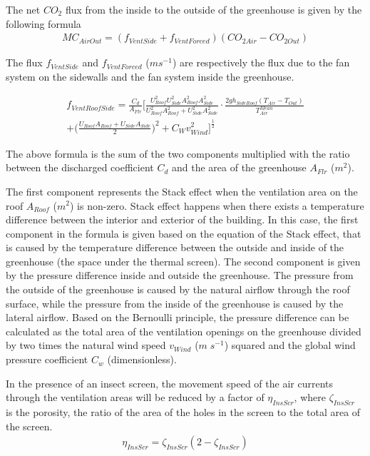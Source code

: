 \documentclass[a4paper]{article}
\begin{document}
The net \(CO_2\) flux from the inside to the outside of the greenhouse is given by the following formula
\begin{align}
  MC_{AirOut} = (f_{VentSide} + f_{VentForced})(CO_{2 Air} - CO_{2 Out})
\end{align}

The flux \(f_{VentSide}\) and \(f_{VentForced}\) (\(m s^{-1}\)) are respectively the flux due to the fan system on the sidewalls and the fan system inside the greenhouse.


\begin{multline}
  \label{eq:vent_roof_side}
  f_{VentRoofSide} = \frac{C_d}{A_{Flr}} \biggl[\frac{U_{Roof}^2 U_{Side}^2 A_{Roof}^2 A_{Side}^2}{U_{Roof}^2 A_{Roof}^2 + U_{Side}^2 A_{Side}^2} \cdot \frac{2gh_{SideRoof} (T_{Air} - T_{Out})}{T_{Air}^{Mean}} \\
    + \biggl(\frac{U_{Roof} A_{Roof} + U_{Side} A_{Side}}{2}\biggr)^2 + C_W v_{Wind}^2\biggr]^{\frac{1}{2}}
\end{multline}

The above formula is the sum of the two components multiplied with the ratio between the discharged coefficient \(C_d\) and the area of the greenhouse \(A_{Flr}\) (\(m^2\)).

The first component represents the Stack effect when the ventilation area on the roof \(A_{Roof}\) (\(m^2\)) is non-zero. Stack effect happens when there exists a temperature difference between the interior and exterior of the building. In this case, the first component in the formula is given based on the equation of the Stack effect, that is caused by the temperature difference between the outside and inside of the greenhouse (the space under the thermal screen).
The second component is given by the pressure difference inside and outside the greenhouse. The pressure from the outside of the greenhouse is caused by the natural airflow through the roof surface, while the pressure from the inside of the greenhouse is caused by the lateral airflow. Based on the Bernoulli principle, the pressure difference can be calculated as the total area of the ventilation openings on the greenhouse divided by two times the natural wind speed \(v_{Wind}\) (\(m\;s^{-1}\)) squared and the global wind pressure coefficient \(C_w\) (dimensionless).

In the presence of an insect screen, the movement speed of the air currents through the ventilation areas will be reduced by a factor of \(\eta_{InsScr}\), where \(\zeta_{InsScr}\) is the porosity, the ratio of the area of the holes in the screen to the total area of the screen.
\begin{align}
  \eta_{InsScr} = \zeta_{InsScr} (2 -  \zeta_{InsScr})
\end{align}
\end{document}

